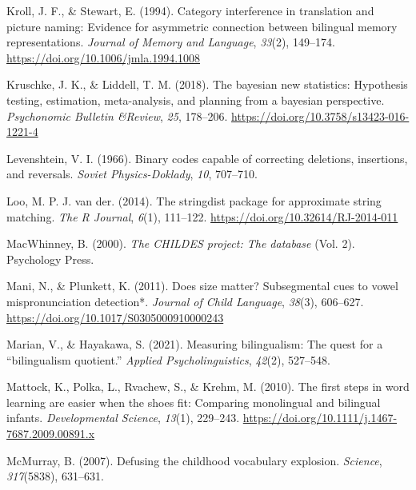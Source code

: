 \documentclass[
]{article}
\newlength{\cslhangindent}
\newlength{\cslentryspacingunit} %
\newenvironment{CSLReferences}[2] %
 {%
  \setlength{\parindent}{0pt}
  \ifodd #1
  \let\oldpar\par
  \def\par{\hangindent=\cslhangindent\oldpar}
  \fi
  \setlength{\parskip}{#2\cslentryspacingunit}
 }%
 {}
\begin{document}
\begin{CSLReferences}{1}{0}
\leavevmode{}%
Kroll, J. F., \& Stewart, E. (1994). Category interference in
translation and picture naming: Evidence for asymmetric connection
between bilingual memory representations. \emph{Journal of Memory and
Language}, \emph{33}(2), 149--174.
\url{https://doi.org/10.1006/jmla.1994.1008}

\leavevmode{}%
Kruschke, J. K., \& Liddell, T. M. (2018). The bayesian new statistics:
Hypothesis testing, estimation, meta-analysis, and planning from a
bayesian perspective. \emph{Psychonomic Bulletin \&Review}, \emph{25},
178--206. \url{https://doi.org/10.3758/s13423-016-1221-4}

\leavevmode{}%
Levenshtein, V. I. (1966). Binary codes capable of correcting deletions,
insertions, and reversals. \emph{Soviet Physics-Doklady}, \emph{10},
707--710.

\leavevmode{}%
Loo, M. P. J. van der. (2014). The stringdist package for approximate
string matching. \emph{The R Journal}, \emph{6}(1), 111--122.
\url{https://doi.org/10.32614/RJ-2014-011}

\leavevmode{}%
MacWhinney, B. (2000). \emph{The {CHILDES} project: The database} (Vol.
2). Psychology Press.

\leavevmode{}%
Mani, N., \& Plunkett, K. (2011). Does size matter? Subsegmental cues to
vowel mispronunciation detection*. \emph{Journal of Child Language},
\emph{38}(3), 606--627. \url{https://doi.org/10.1017/S0305000910000243}

\leavevmode{}%
Marian, V., \& Hayakawa, S. (2021). Measuring bilingualism: The quest
for a {``bilingualism quotient.''} \emph{Applied Psycholinguistics},
\emph{42}(2), 527--548.

\leavevmode{}%
Mattock, K., Polka, L., Rvachew, S., \& Krehm, M. (2010). The first
steps in word learning are easier when the shoes fit: Comparing
monolingual and bilingual infants. \emph{Developmental Science},
\emph{13}(1), 229--243.
\url{https://doi.org/10.1111/j.1467-7687.2009.00891.x}

\leavevmode{}%
McMurray, B. (2007). Defusing the childhood vocabulary explosion.
\emph{Science}, \emph{317}(5838), 631--631.


\end{CSLReferences}
\end{document}
